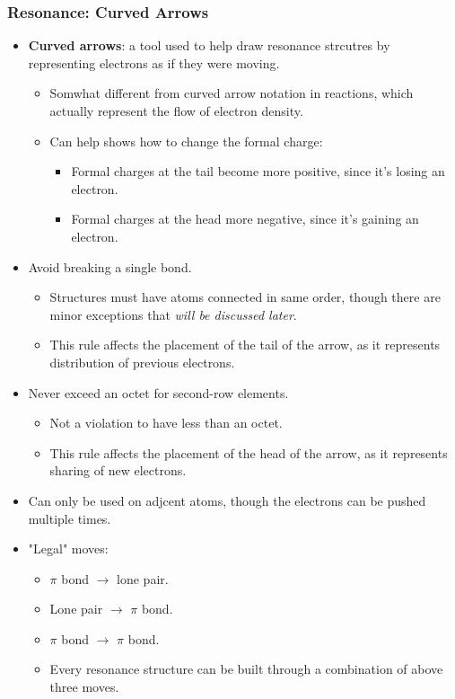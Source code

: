\documentclass[12pt,a4paper]{article}
\begin{document}
\begin{itemize}
    \subsubsection{Resonance: Curved Arrows}
    \begin{itemize}
        \item \textbf{Curved arrows}: a tool used to help draw resonance strcutres by {\color{o-Sun}representing electrons as if} they were moving.
            \begin{itemize}
                \item Somwhat different from curved arrow notation in reactions, which actually represent the flow of electron density.
                \item Can help shows how to change the formal charge:
                    \begin{itemize}
                        \item Formal charges at the {\color{o-Sun}tail} become more {\color{pos}positive}, since it's losing an electron.
                        \item Formal charges at the {\color{o-Sun}head} more {\color{neg}negative}, since it's gaining an electron.
                    \end{itemize}
            \end{itemize}
        \item {\color{o-Sun}Avoid breaking a single bond}.
            \begin{itemize}
                \item Structures must have atoms connected in same order, though there are minor exceptions that \textit{will be discussed later}.
                \item This rule affects the placement of the {\color{o-Sun}tail} of the arrow, as it represents distribution of previous electrons.
            \end{itemize}
        \item {\color{o-Sun}Never exceed an octet for second-row elements}.
            \begin{itemize}
                \item Not a violation to have less than an octet. 
                \item This rule affects the placement of the {\color{o-Sun}head} of the arrow, as it represents sharing of new electrons.
            \end{itemize} 
        \item Can only be used on adjcent atoms, though the electrons 
        can be pushed multiple times.
        \item "Legal" moves: 
            \begin{itemize}
                \item $\pi$ bond $\rightarrow$ lone pair. 
                \item Lone pair $\rightarrow$ $\pi$ bond.
                \item $\pi$ bond $\rightarrow$ $\pi$ bond.
                \item Every resonance structure can be built through a combination of above three moves.
            \end{itemize}
    \end{itemize}

\end{itemize}
\end{document}
